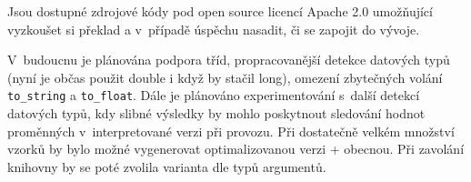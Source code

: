 \documentclass[czech]{ExcelAtFIT}
\newcommand{\function}[1]{\texttt{#1}}
\begin{document}



	Jsou dostupné zdrojové kódy pod open source licencí Apache 2.0 umožňující vyzkoušet si překlad a v~případě úspěchu nasadit, či se zapojit do vývoje.

	V~budoucnu je plánována podpora tříd, propracovanější detekce datových typů (nyní je občas použit double i když by stačil long), omezení zbytečných volání \function{to\_string} a \function{to\_float}. Dále je plánováno ex\-pe\-ri\-men\-to\-vá\-ní s~další detekcí datových typů, kdy slibné výsledky by mohlo poskytnout sledování hodnot pro\-měn\-ných v~interpretované verzi při provozu. Při dos\-ta\-teč\-ně velkém množství vzorků by bylo možné vygenerovat optimalizovanou verzi + obecnou. Při zavolání knihovny by se poté zvolila varianta dle typů argumentů.





\end{document}
